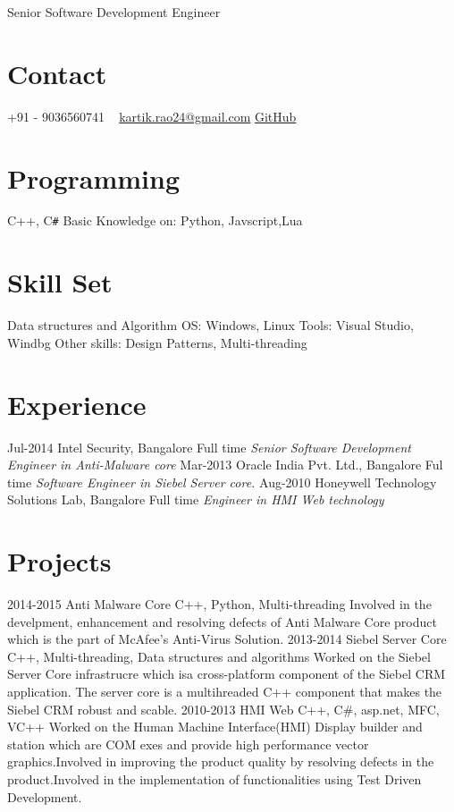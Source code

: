 \documentclass[]{kartikkumar-cv}
\begin{document}
       {Senior Software Development Engineer}
          
\begin{aside}
  \section{Contact}
    +91 - 9036560741
    ~
    \href{mailto:kartik.rao24@gmail.com}{kartik.rao24@gmail.com}
    \href{https://github.com/raokartikkumar24}{GitHub}
    ~
  \section{Programming}
    C++, C\texttt{\#}
    Basic Knowledge on:
    Python, Javscript,Lua
    ~
   \section{Skill Set}
   Data structures and Algorithm
   OS: Windows, Linux
   Tools: Visual Studio, Windbg
   Other skills: Design Patterns, Multi-threading
\end{aside}

\section{Experience}

\begin{entrylist}
  \entry
    {Jul-2014}
    {Intel Security, Bangalore}
    {Full time}
    {\emph{Senior Software Development Engineer in Anti-Malware core}}
  \entry
    {Mar-2013}
    {Oracle India Pvt. Ltd., Bangalore}
    {Ful time}
    {\emph{Software Engineer in Siebel Server core.}}
  \entry
    {Aug-2010}
    {Honeywell Technology Solutions Lab, Bangalore}
    {Full time}
    {\emph{Engineer in HMI Web technology}}
\end{entrylist}

\section{Projects}

\begin{entrylist}
  \entry
    {2014-2015}
    {Anti Malware Core}
    {C++, Python, Multi-threading}
    {Involved in the develpment, enhancement and resolving defects of Anti
    Malware Core product which is the part of McAfee's Anti-Virus Solution.}
  \entry
    {2013-2014}
    {Siebel Server Core}
    {C++, Multi-threading, Data structures and algorithms }
    {Worked on the Siebel Server Core infrastrucre which isa cross-platform
    component of the Siebel CRM application. The server core is a multihreaded
    C++ component that makes the Siebel CRM robust and scable.}
  \entry
    {2010-2013}
    {HMI Web}
    {C++, C\#, asp.net, MFC, VC++}
    {Worked on the Human Machine Interface(HMI) Display builder and station
    which are COM exes and provide high performance vector graphics.Involved in improving the product quality by resolving defects in the product.Involved in the implementation of functionalities using Test Driven
    Development.}
\end{entrylist}
\end{document}
